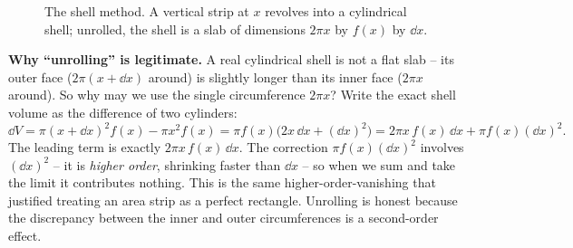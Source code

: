 \begin{figure}[H]
\centering
{}
\caption{The shell method. A vertical strip at $x$ revolves into a cylindrical
shell; unrolled, the shell is a slab of dimensions $2\pi x$ by $f(x)$ by $\dd x$.}
\label{ch26:fig-shell}
\end{figure}

\begin{whybox}
\textbf{Why ``unrolling'' is legitimate.} A real cylindrical shell is not a flat
slab -- its outer face ($2\pi(x+\dd x)$ around) is slightly longer than its inner
face ($2\pi x$ around). So why may we use the single circumference $2\pi x$? Write
the exact shell volume as the difference of two cylinders:
\[
  \dd V = \pi(x+\dd x)^2 f(x) - \pi x^2 f(x)
        = \pi f(x)\bigl(2x\,\dd x + (\dd x)^2\bigr)
        = 2\pi x\,f(x)\,\dd x + \pi f(x)(\dd x)^2.
\]
The leading term is exactly $2\pi x\,f(x)\,\dd x$. The correction
$\pi f(x)(\dd x)^2$ involves $(\dd x)^2$ -- it is \emph{higher order}, shrinking
faster than $\dd x$ -- so when we sum and take the limit it contributes nothing.
This is the same higher-order-vanishing that justified treating an area strip as a
perfect rectangle. Unrolling is honest because the discrepancy between the inner
and outer circumferences is a second-order effect.
\end{whybox}

